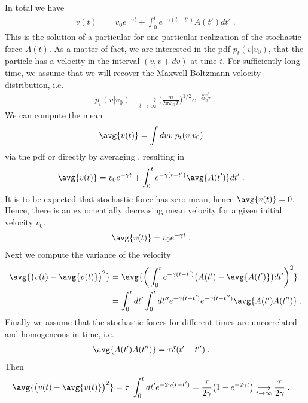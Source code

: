 %
In total we have 
%
\begin{align}\label{eq:stoch:v:t}
v(t) &= v_{0} e^{-\gamma t} + \int_{0}^{t} e^{-\gamma(t-t')} A(t') dt'\;.
\end{align}
%
This is the solution of a particular for one  particular  realization of the 
stochastic force $A(t)$. As a matter of fact, we are interested in the pdf
$ p_{t}(v|v_{0}) $, that  the particle has a velocity in the interval $(v,v+dv)$ at time $t$.
%
For sufficiently long time, we assume that we will recover the Maxwell-Boltzmann velocity distribution, i.e.
%
\begin{align}\label{eq:stochastic:MB}
p_{t}(v|v_{0}) &\underset{t\to\infty}{\longrightarrow} \bigg(\frac{m}{2\pi k_{B} T}\bigg)^{1/2} e^{-\frac{m v^{2}}{2 k_{B}T}}\;.
\end{align}
%
We can compute the mean 
%
\begin{align*}
\avg{v(t)} &= \int dv v\;p_{t}(v|v_{0}) 
\end{align*}
%
via the pdf or directly by averaging  , resulting in
\begin{align}\label{eq:stoch:v:t}
\avg{v(t)} &= v_{0} e^{-\gamma t} + \int_{0}^{t} e^{-\gamma(t-t')} \avg{A(t')} dt'\;.
\end{align}
It is to be expected that stochastic force has zero mean, hence $\avg{v(t)}=0$.
Hence, there is an exponentially decreasing mean velocity for a given initial velocity $v_{0}$.
%
\begin{align*}
\avg{v(t)} &= v_{0} e^{-\gamma t}\;.
\end{align*}
%
Next we compute the variance of the velocity
%
\begin{align*}
\avg{\big( v(t)-\avg{v(t)} \big)^{2}} &=
\avg{\bigg(\int_{0}^{t} e^{-\gamma(t-t')} \big(A(t') -\avg{A(t')}\big)dt'\bigg)^{2}}\\
&=\int_{0}^{t} dt' \int_{0}^{t} dt'' e^{-\gamma(t-t')} e^{-\gamma(t-t'')}
\avg{A(t')A(t'')} \;.
\end{align*}
%
Finally we assume that the stochastic forces for different times are uncorrelated and homogeneous in time,  i.e.
%
\begin{align}
\avg{A(t')A(t'')} &= \tau \delta(t'-t'')\;.
\end{align}
%
Then
%
\begin{align*}
\avg{\big( v(t)-\avg{v(t)} \big)^{2}} 
&=\tau \; \int_{0}^{t} dt'  e^{-2\gamma(t-t')} =
\frac{\tau}{2\gamma} \big( 1-e^{-2 \gamma t} \big)
\underset{t\to \infty}{\longrightarrow} \frac{\tau }{2\gamma}\;.
\end{align*}
